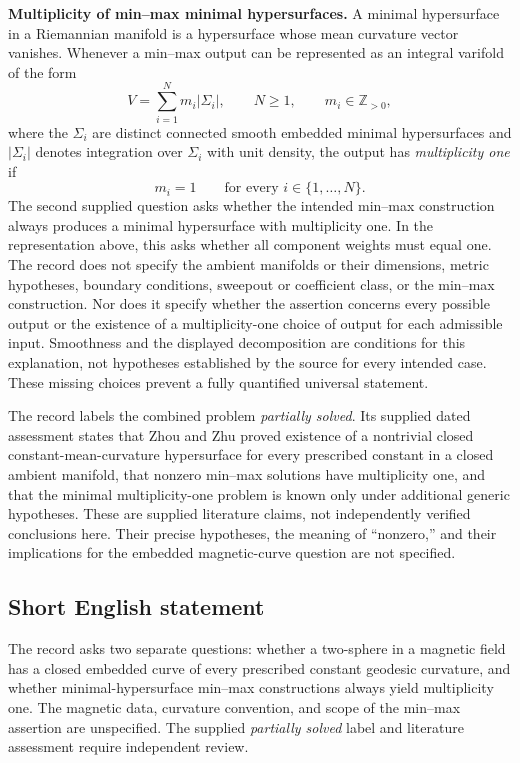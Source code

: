 \documentclass[11pt]{article}
\newcommand{\Z}{\mathbb{Z}}
\begin{document}
\textbf{Multiplicity of min--max minimal hypersurfaces.} A minimal hypersurface in a Riemannian manifold is a hypersurface whose mean curvature vector vanishes. Whenever a min--max output can be represented as an integral varifold of the form
\[
V=\sum_{i=1}^{N}m_i|\Sigma_i|,
\qquad N\geq 1,\qquad m_i\in\Z_{>0},
\]
where the \(\Sigma_i\) are distinct connected smooth embedded minimal hypersurfaces and \(|\Sigma_i|\) denotes integration over \(\Sigma_i\) with unit density, the output has \emph{multiplicity one} if
\[
m_i=1\qquad\text{for every }i\in\{1,\ldots,N\}.
\]
The second supplied question asks whether the intended min--max construction always produces a minimal hypersurface with multiplicity one. In the representation above, this asks whether all component weights must equal one. The record does not specify the ambient manifolds or their dimensions, metric hypotheses, boundary conditions, sweepout or coefficient class, or the min--max construction. Nor does it specify whether the assertion concerns every possible output or the existence of a multiplicity-one choice of output for each admissible input. Smoothness and the displayed decomposition are conditions for this explanation, not hypotheses established by the source for every intended case. These missing choices prevent a fully quantified universal statement.

The record labels the combined problem \emph{partially solved}. Its supplied dated assessment states that Zhou and Zhu proved existence of a nontrivial closed constant-mean-curvature hypersurface for every prescribed constant in a closed ambient manifold, that nonzero min--max solutions have multiplicity one, and that the minimal multiplicity-one problem is known only under additional generic hypotheses. These are supplied literature claims, not independently verified conclusions here. Their precise hypotheses, the meaning of ``nonzero,'' and their implications for the embedded magnetic-curve question are not specified.
\subsection{Short English statement}
The record asks two separate questions: whether a two-sphere in a magnetic field has a closed embedded curve of every prescribed constant geodesic curvature, and whether minimal-hypersurface min--max constructions always yield multiplicity one. The magnetic data, curvature convention, and scope of the min--max assertion are unspecified. The supplied \emph{partially solved} label and literature assessment require independent review.
\end{document}
